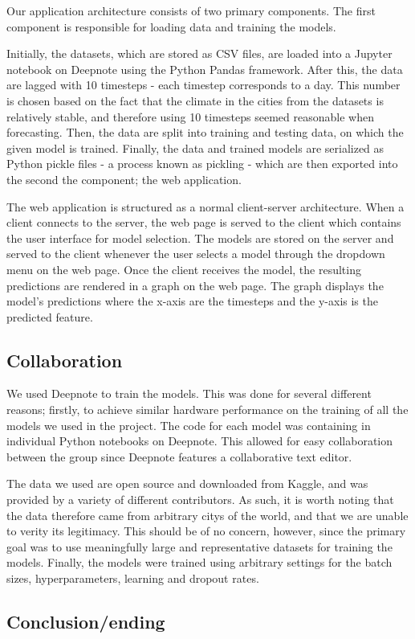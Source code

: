 Our application architecture consists of two primary components.
The first component is responsible for loading data and training the models.

Initially, the datasets, which are stored as CSV files, are loaded into a Jupyter notebook on Deepnote using the Python Pandas framework.
After this, the data are lagged with 10 timesteps - each timestep corresponds to a day.
This number is chosen based on the fact that the climate in the cities from the datasets is relatively stable, and therefore using 10 timesteps seemed reasonable when forecasting.
Then, the data are split into training and testing data, on which the given model is trained. 
Finally, the data and trained models are serialized as Python pickle files - a process known as pickling - which are then exported into the second the component; the web application.

The web application is structured as a normal client-server architecture.
When a client connects to the server, the web page is served to the client which contains the user interface for model selection.
The models are stored on the server and served to the client whenever the user selects a model through the dropdown menu on the web page.
Once the client receives the model, the resulting predictions are rendered in a graph on the web page.
The graph displays the model's predictions where the x-axis are the timesteps and the y-axis is the predicted feature.


\subsection{Collaboration}
We used Deepnote\cite{deepnote} to train the models. 
This was done for several different reasons; firstly, to achieve similar hardware performance on the training of all the models we used in the project.
The code for each model was containing in individual Python notebooks on Deepnote.
This allowed for easy collaboration between the group since Deepnote features a collaborative text editor.

The data we used are open source and downloaded from Kaggle\cite{kaggle}, and was provided by a variety of different contributors.
As such, it is worth noting that the data therefore came from arbitrary citys of the world, and that we are unable to verity its legitimacy.
This should be of no concern, however, since the primary goal was to use meaningfully large and representative datasets for training the models.
Finally, the models were trained using arbitrary settings for the batch sizes, hyperparameters, learning and dropout rates.


\subsection{Conclusion/ending}
